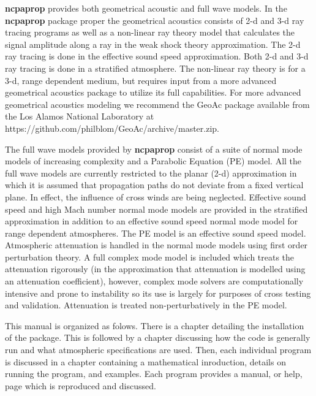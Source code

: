 \textbf{ncpaprop} provides both geometrical acoustic and full wave models. In the \textbf{ncpaprop} package proper the geometrical acoustics consists of 2-d and 3-d ray tracing programs as well as a non-linear ray theory model that calculates the signal amplitude along a ray in the weak shock theory approximation. The 2-d ray tracing is done in the effective sound speed approximation. Both 2-d and 3-d ray tracing is done in a stratified atmosphere. The non-linear ray theory is for a 3-d, range dependent medium, but requires input from a more advanced geometrical acoustics package to utilize its full capabilities. For more advanced geometrical acoustics modeling we recommend the GeoAc package available from the Los Alamos National Laboratory at https://github.com/philblom/GeoAc/archive/master.zip. 

The full wave models provided by \textbf{ncpaprop} consist of a suite of normal mode models of increasing complexity and a Parabolic Equation (PE) model. All the full wave models are currently restricted to the planar (2-d) approximation in which it is assumed that propagation paths do not deviate from a fixed vertical plane. In effect, the influence of cross winds are being neglected. Effective sound speed and high Mach number normal mode models are provided in the stratified approximation in addition to an effective sound speed normal mode model for range dependent atmospheres. The PE model is an effective sound speed model. Atmospheric attenuation is handled in the normal mode models using first order perturbation theory. A full complex mode model is included which treats the attenuation rigorously (in the approximation that attenuation is modelled using an attenuation coefficient), however, complex mode solvers are computationally intensive and prone to instability so its use is largely for purposes of cross testing and validation. Attenuation is treated non-perturbatively in the PE model. 

This manual is organized as folows. There is a chapter detailing the installation of the package. This is followed by a chapter discussing how the code is generally run and what atmospheric specifications are used. Then, each individual program is discussed in a chapter containing a mathematical inroduction, details on running the program, and examples. Each program provides a manual, or help, page which is reproduced and discussed. 